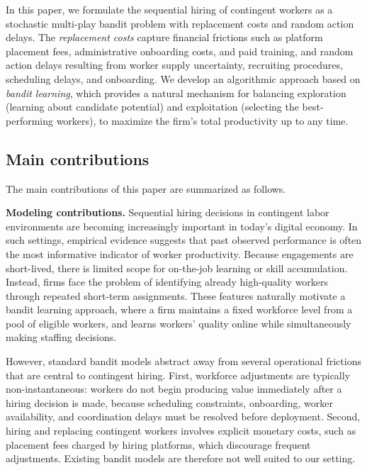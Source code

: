 \documentclass[opre,blindrev]{informs3}
\begin{document}
In this paper, we formulate the sequential hiring of contingent workers as a stochastic multi-play bandit problem with replacement costs and random action delays. 
The \emph{replacement costs} capture financial frictions such as platform placement fees, administrative onboarding costs, and paid training, and random action delays resulting from worker supply uncertainty, recruiting procedures, scheduling delays, and onboarding.
We develop an algorithmic approach based on \emph{bandit learning}, which provides a natural mechanism for balancing exploration (learning about candidate potential) and exploitation (selecting the best-performing workers), to maximize the firm's total productivity up to any time.


\vspace{-.1in}

\subsection{Main contributions}
The main contributions of this paper are summarized as follows.

{\bf Modeling contributions.}
Sequential hiring decisions in contingent labor environments are becoming increasingly important in today’s digital economy. In such settings, empirical evidence suggests that past observed performance is often the most informative indicator of worker productivity. Because engagements are short-lived, there is limited scope for on-the-job learning or skill accumulation. Instead, firms face the problem of identifying already high-quality workers through repeated short-term assignments. These features naturally motivate a bandit learning approach, where a firm maintains a fixed workforce level from a pool of eligible workers, %
and learns workers' quality online while simultaneously 
making staffing decisions.

However, standard bandit models abstract away from several operational frictions that are central to contingent hiring. First, workforce adjustments are typically non-instantaneous: workers do not begin producing value immediately after a hiring decision is made, because scheduling constraints, onboarding, worker availability, and coordination delays must be resolved before deployment. Second, hiring and replacing contingent workers involves explicit monetary costs, such as placement fees charged by hiring platforms, which discourage frequent adjustments. Existing bandit models are therefore not well suited to our setting.
\end{document}
